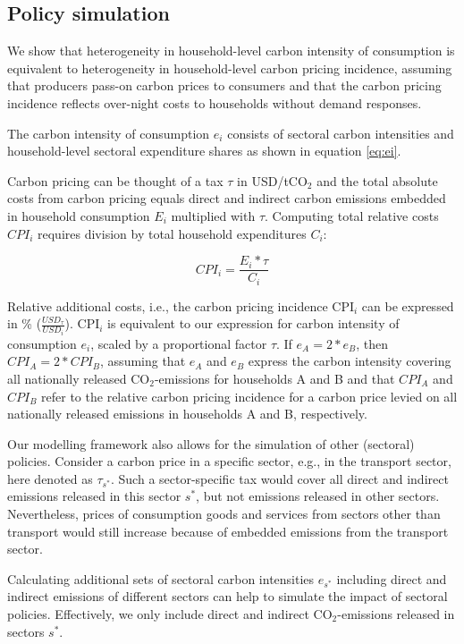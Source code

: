 \documentclass[12pt, a4paper]{article}
\begin{document}
\subsection{Policy simulation}\label{sec:policysimulation}

We show that heterogeneity in household-level carbon intensity of consumption is equivalent to heterogeneity in household-level carbon pricing incidence, assuming that producers pass-on carbon prices to consumers and that the carbon pricing incidence reflects over-night costs to households without demand responses.

The carbon intensity of consumption $e_{i}$ consists of sectoral carbon intensities and household-level sectoral expenditure shares as shown in equation \ref{eq:ei}. 

Carbon pricing can be thought of a tax $\tau$ in USD/tCO$_{2}$ and the total absolute costs from carbon pricing equals direct and indirect carbon emissions embedded in household consumption $E_{i}$ multiplied with $\tau$. Computing total relative costs $CPI_{i}$ requires division by total household expenditures $C_{i}$:

\begin{equation}
    CPI_{i} = \frac{E_{i}*\tau}{C_{i}}
\end{equation}

Relative additional costs, i.e., the carbon pricing incidence CPI$_{i}$ can be expressed in \% ($\frac{USD_{\tau}}{USD_{i}}$). CPI$_{i}$ is equivalent to our expression for carbon intensity of consumption $e_{i}$, scaled by a proportional factor $\tau$. If $e_{A}=2*e_{B}$, then $CPI_{A}=2*CPI_{B}$, assuming that $e_{A}$ and $e_{B}$ express the carbon intensity covering all nationally released CO$_{2}$-emissions for households A and B and that $CPI_{A}$ and $CPI_{B}$ refer to the relative carbon pricing incidence for a carbon price levied on all nationally released emissions in households A and B, respectively.

Our modelling framework also allows for the simulation of other (sectoral) policies. Consider a carbon price in a specific sector, e.g., in the transport sector, here denoted as $\tau_{s^{*}}$. Such a sector-specific tax would cover all direct and indirect emissions released in this sector $s^{*}$, but not emissions released in other sectors. Nevertheless, prices of consumption goods and services from sectors other than transport would still increase because of embedded emissions from the transport sector.

Calculating additional sets of sectoral carbon intensities $e_{s^{*}}$ including direct and indirect emissions of different sectors can help to simulate the impact of sectoral policies. Effectively, we only include direct and indirect CO$_{2}$-emissions released in sectors $s^{*}$.
\end{document}
